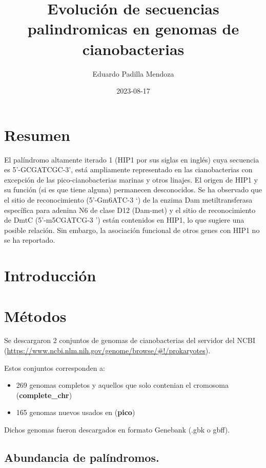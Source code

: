\documentclass[
]{book}
\title{Evolución de secuencias palindromicas en genomas de cianobacterias}
\author{Eduardo Padilla Mendoza}
\date{2023-08-17}
\providecommand{\tightlist}{%
  \setlength{\itemsep}{0pt}\setlength{\parskip}{0pt}}
\begin{document}
\maketitle

{
\setcounter{tocdepth}{1}
\tableofcontents
}
\hypertarget{resumen}{%
\chapter*{Resumen}\label{resumen}}

El palíndromo altamente iterado 1 (HIP1 por sus siglas en inglés) cuya secuencia es 5'-GCGATCGC-3', está ampliamente representado en las cianobacterias con excepción de las pico-cianobacterias marinas y otros linajes. El origen de HIP1 y su función (si es que tiene alguna) permanecen desconocidos. Se ha observado que el sitio de reconocimiento (5'-Gm6ATC-3 `) de la enzima Dam metiltransferasa específica para adenina N6 de clase D12 (Dam-met) y el sitio de reconocimiento de DmtC (5'-m5CGATCG-3 ') están contenidos en HIP1, lo que sugiere una posible relación. Sin embargo, la asociación funcional de otros genes con HIP1 no se ha reportado.

\hypertarget{introducciuxf3n}{%
\chapter{Introducción}\label{introducciuxf3n}}

\hypertarget{muxe9todos}{%
\chapter{Métodos}\label{muxe9todos}}

Se descargaron 2 conjuntos de genomas de cianobacterias del servidor del NCBI (\url{https://www.ncbi.nlm.nih.gov/genome/browse/\#!/prokaryotes}).

Estos conjuntos corresponden a:

\begin{itemize}
\tightlist
\item
  269 genomas completos y aquellos que solo contenian el cromosoma (\textbf{complete\_chr})
\item
  165 genomas nuevos usados en \citet{cabello2022elucidating} (\textbf{pico})
\end{itemize}

Dichos genomas fueron descargados en formato Genebank (.gbk o gbff).

\hypertarget{abundancia-de-paluxedndromos.}{%
\section{Abundancia de palíndromos.}\label{abundancia-de-paluxedndromos.}}
\end{document}
